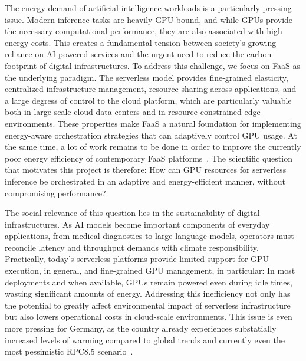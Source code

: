 The energy demand of artificial intelligence workloads is a particularly pressing issue.
Modern inference tasks are heavily GPU-bound, and while GPUs provide the necessary computational performance, they are also associated with high energy costs.
This creates a fundamental tension between society's growing reliance on AI-powered services and the urgent need to reduce the carbon footprint of digital infrastructures.
To address this challenge, we focus on FaaS as the underlying paradigm.
The serverless model provides fine-grained elasticity, centralized infrastructure management, resource sharing across applications, and a large degress of control to the cloud platform, which are particularly valuable both in large-scale cloud data centers and in resource-constrained edge environments.
These properties make FaaS a natural foundation for implementing energy-aware orchestration strategies that can adaptively control GPU usage.
At the same time, a lot of work remains to be done in order to improve the currently poor energy efficiency of contemporary FaaS platforms~\cite{sharma_challenges_2023}.
The scientific question that motivates this project is therefore: How can GPU resources for serverless inference be orchestrated in an adaptive and energy-efficient manner, without compromising performance?

The social relevance of this question lies in the sustainability of digital infrastructures.
As AI models become important components of everyday applications, from medical diagnostics to large language models, operators must reconcile latency and throughput demands with climate responsibility.
Practically, today's serverless platforms provide limited support for GPU execution, in general, and fine-grained GPU management, in particular: In most deployments and when available, GPUs remain powered even during idle times, wasting significant amounts of energy.
Addressing this inefficiency not only has the potential to greatly affect environmental impact of serverless infrastructure but also lowers operational costs in cloud-scale environments.
This issue is even more pressing for Germany, as the country already experiences substatially increased levels of warming compared to global trends and currently even the most pessimistic RPC8.5 scenario~\cite{dwd_2024_klimastatusbericht}.

